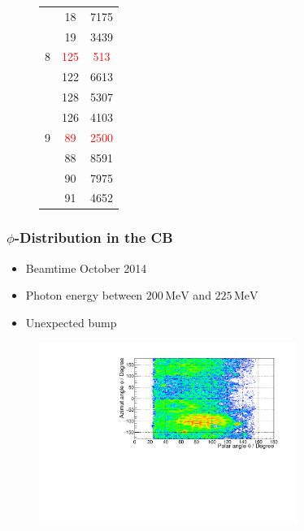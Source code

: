 \documentclass[slidestop,compress,mathserif]{beamer}
\begin{document}
\begin{frame}
\begin{figure}
\begin{minipage}[t]{.4\textwidth}
{\begin{tabular}{lcc}
				& 18& 7175 \\
				
				& 19& 3439 \\
				
				\hline
				
				8 & \textcolor{red}{125} &\textcolor{red}{513} \\
				
				
				& 122& 6613\\
				
				& 128 & 5307 \\
				
				& 126 & 4103 \\
				
				\hline
				
				9 & \textcolor{red}{89}& \textcolor{red}{2500}\\
				
				& 88& 8591\\
				
				&90&7975 \\
				
				&91&4652 \\
				
				
				
			\end{tabular}
		}	
		\end{minipage}
	\end{figure}
\end{frame}

\begin{frame}
	\frametitle{$\phi$-Distribution in the CB}
	\begin{itemize}
		\item Beamtime October 2014
		\item Photon energy between $200\,\text{MeV}$ and $225\,\text{MeV}$
		\item Unexpected bump
	\end{itemize}
	\begin{figure}
		\includegraphics[width=0.75\textwidth]{Pictures/20172404ThetaPhi200MeVBeam}
		
	\end{figure}
\end{frame}
\end{document}
